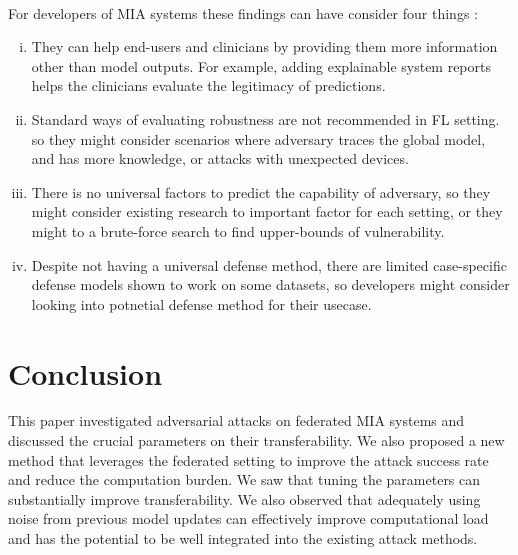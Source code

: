 \\For developers of MIA systems these findings can have consider four things :

\begin{enumerate}[(i)]
    \item They can help end-users and clinicians by providing them more information other than model outputs. For example, adding explainable system reports helps the clinicians evaluate the legitimacy of predictions.
    \item Standard ways of evaluating robustness \cite{carlini2019evaluating}are not recommended in FL setting. so they might consider scenarios where adversary traces the global model, and has more knowledge, or attacks with unexpected devices.
    \item There is no universal factors to predict the capability of adversary, so they might consider existing research to important factor for each setting, or they might to a brute-force search to find upper-bounds of vulnerability. \cite{carlini2019evaluating} 
     \item Despite not having a universal defense method, there are limited case-specific defense models shown to work on some datasets, \cite{graese2016assessing} so developers might consider looking into potnetial defense method for their usecase.
\end{enumerate}







\section{Conclusion}


This paper investigated adversarial attacks on federated MIA systems and discussed the crucial parameters on their transferability. We also proposed a new method that leverages the federated setting to improve the attack success rate and reduce the computation burden.
We saw that tuning the parameters can substantially improve transferability.
We also observed that adequately using noise from previous model updates can effectively improve computational load and has the potential to be well integrated into the existing attack methods.

